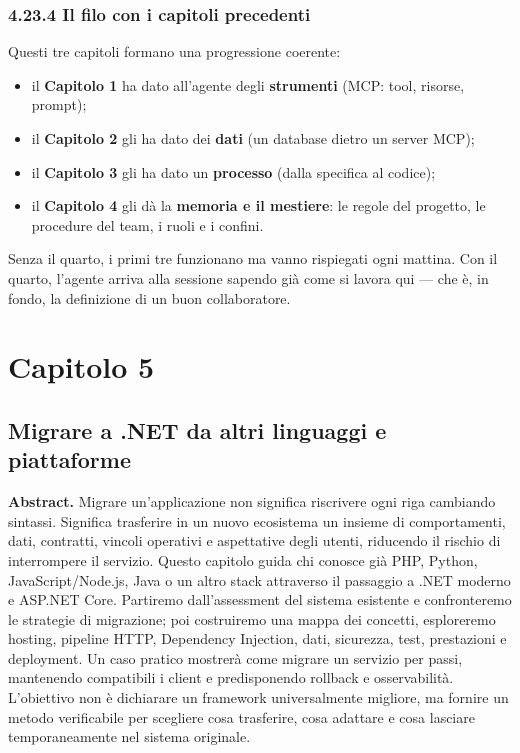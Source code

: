 \documentclass[
  italian,
  10pt,
]{book}
\providecommand{\tightlist}{%
  \setlength{\itemsep}{0pt}\setlength{\parskip}{0pt}}
\begin{document}
\subsection{4.23.4 Il filo con i capitoli
precedenti}\label{il-filo-con-i-capitoli-precedenti}

Questi tre capitoli formano una progressione coerente:

\begin{itemize}
\tightlist
\item
  il \textbf{Capitolo 1} ha dato all'agente degli \textbf{strumenti}
  (MCP: tool, risorse, prompt);
\item
  il \textbf{Capitolo 2} gli ha dato dei \textbf{dati} (un database
  dietro un server MCP);
\item
  il \textbf{Capitolo 3} gli ha dato un \textbf{processo} (dalla
  specifica al codice);
\item
  il \textbf{Capitolo 4} gli dà la \textbf{memoria e il mestiere}: le
  regole del progetto, le procedure del team, i ruoli e i confini.
\end{itemize}

Senza il quarto, i primi tre funzionano ma vanno rispiegati ogni
mattina. Con il quarto, l'agente arriva alla sessione sapendo già come
si lavora qui --- che è, in fondo, la definizione di un buon
collaboratore.

\chapter{Capitolo 5}\label{capitolo-5}

\section{Migrare a .NET da altri linguaggi e
piattaforme}\label{migrare-a-.net-da-altri-linguaggi-e-piattaforme}

\textbf{Abstract.} Migrare un'applicazione non significa riscrivere ogni
riga cambiando sintassi. Significa trasferire in un nuovo ecosistema un
insieme di comportamenti, dati, contratti, vincoli operativi e
aspettative degli utenti, riducendo il rischio di interrompere il
servizio. Questo capitolo guida chi conosce già PHP, Python,
JavaScript/Node.js, Java o un altro stack attraverso il passaggio a .NET
moderno e ASP.NET Core. Partiremo dall'assessment del sistema esistente
e confronteremo le strategie di migrazione; poi costruiremo una mappa
dei concetti, esploreremo hosting, pipeline HTTP, Dependency Injection,
dati, sicurezza, test, prestazioni e deployment. Un caso pratico
mostrerà come migrare un servizio per passi, mantenendo compatibili i
client e predisponendo rollback e osservabilità. L'obiettivo non è
dichiarare un framework universalmente migliore, ma fornire un metodo
verificabile per scegliere cosa trasferire, cosa adattare e cosa
lasciare temporaneamente nel sistema originale.
\end{document}
